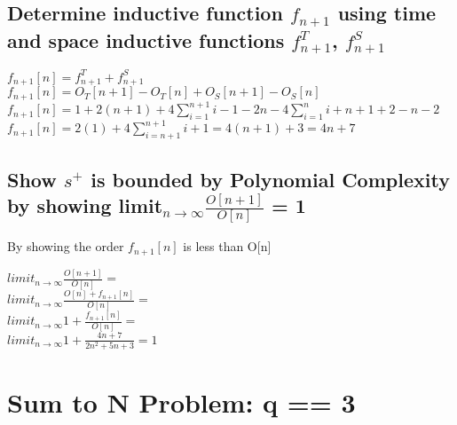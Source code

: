 \documentclass[11pt]{article}
\begin{document}
\subsection{Determine inductive function $f_{n+1}$ using time and space inductive functions $f^{T}_{n+1}$, $f^{S}_{n+1}$}
\begin{center}
$
f_{n+1}[n] = f^{T}_{n+1} + f^{S}_{n+1}
$
\\ \vspace{2mm}
$
f_{n+1}[n] = O_T[n+1] - O_T[n] +  O_S[n+1] - O_S[n]
$
\\ \vspace{2mm}
$
f_{n+1}[n] =  1 + 2(n+1) + 4\sum_{i=1}^{n+1}i - 1 - 2n - 4\sum_{i=1}^{n}i +  n + 1 + 2 - n - 2
$
\\ \vspace{2mm}
$
f_{n+1}[n] =   2(1) + 4\sum_{i=n+1}^{n+1}i  + 1 = 4(n+1) + 3 = 4n + 7
$
\end{center}


\subsection{Show $s^+$ is bounded by Polynomial Complexity by showing limit$_{n \rightarrow \infty}\frac{O[n+1]}{O[n]}$ = 1}
By showing the order $f_{n+1}[n]$ is less than O[n]
\begin{center}
$
limit_{n \rightarrow \infty}\frac{O[n+1]}{O[n]} = 
$
\\ \vspace{2mm}
$
limit_{n \rightarrow \infty}\frac{O[n]+ f_{n+1}[n]}{O[n]} = 
$
\\ \vspace{2mm}
$
limit_{n \rightarrow \infty} 1 + \frac{f_{n+1}[n]}{O[n]} = 
$
\\ \vspace{2mm}
$
limit_{n \rightarrow \infty} 1 + \frac{4n+7}{2n^2 + 5n + 3} = 1
$
\end{center}









\newpage
\section{Sum to N Problem: q == 3}
\end{document}
